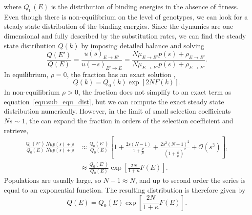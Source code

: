 \documentclass[10pt,a4paper]{article}
\begin{document}
where $Q_0(E)$ is the distribution of binding energies in the absence of fitness. Even though there is non-equilibrium on the level of genotypes, 
we can look for a steady state distribution of the binding energies. Since the dynamics are one dimensional and fully described by the substitution rates, 
we can find the steady state distribution $Q(k)$ by imposing detailed balance and solving
\begin{equation}
\frac{Q(E')}{Q(E)}=\frac{u(s)_{E\rightarrow E'}}{u(-s)_{E'\rightarrow E}}=  \frac{ N\mu_{E\rightarrow E'}p(s)+\rho_{E\rightarrow E'}}{N\mu_{E\rightarrow E'}p(s)
+\rho_{E\rightarrow E'}}.
\end{equation}
In equilibrium, $\rho=0$, the fraction has an exact solution \cite{berg2003stochastic},
\begin{equation}
	Q(k) = Q_0(k)\exp[2NF(k)].
	\label{equ:sub_equ_dist}
\end{equation}
In non-equilibrium $\rho>0$, the fraction does not simplify to an exact term as equation~\ref{equ:sub_equ_dist}, but we can compute the exact steady state 
distribution numerically. However, in the limit of small selection coefficients $Ns\sim1$, the can expand the fraction in orders of the selection coefficient 
and retrieve,
\begin{align}
\frac{Q_0(E')}{Q_0(E)}\frac{ N\mu p(s)+\rho}{N\mu p(s)+\rho}&\approx \frac{Q_0(E')}{Q_0(E)}\left[1+\frac{2s(N-1)}{1+\frac{\rho}{\mu}}+\frac{2s^2(N-1)^2}
{(1+\frac{\rho}{\mu})^2}+\mathcal{O}(s^3)\right] ,\nonumber\\
&\approx \frac{Q_0(E')}{Q_0(E)}\exp\left[\frac{2N}{1+\kappa}F(E)\right].
\end{align}
Populations are usually large, so $N-1\approx N$, and up to second order the series is equal to an exponential function. The resulting distribution is therefore 
given by
\begin{equation}
	Q(E) = Q_0(E) \exp\left[ \frac{2N}{1+\kappa} F(E) \right].
\end{equation}
\end{document}
